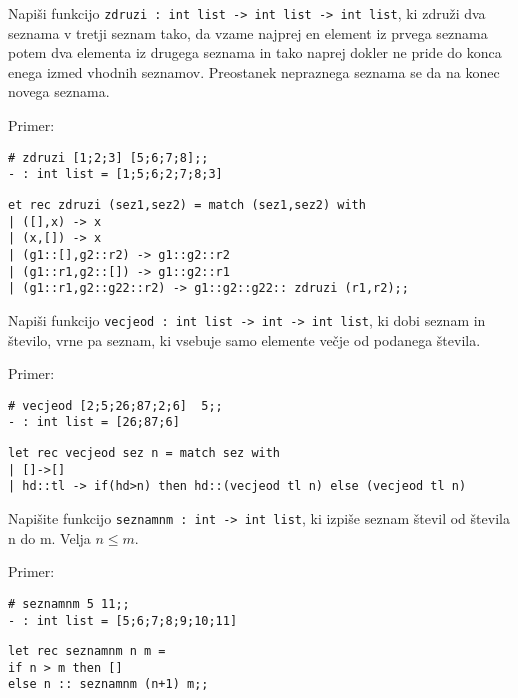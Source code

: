 \begin{ex} 
Napi\v si funkcijo \texttt{zdruzi : int list -> int list -> int list}, ki zdru\v zi dva seznama v tretji seznam tako, da vzame najprej en element iz prvega seznama potem dva elementa iz drugega seznama in tako naprej dokler ne pride do konca enega izmed vhodnih seznamov. Preostanek nepraznega seznama se da na konec novega seznama.

Primer: \begin{verbatim}
# zdruzi [1;2;3] [5;6;7;8];;
- : int list = [1;5;6;2;7;8;3]
\end{verbatim}

\begin{sol}
\begin{verbatim}
et rec zdruzi (sez1,sez2) = match (sez1,sez2) with
| ([],x) -> x 
| (x,[]) -> x 
| (g1::[],g2::r2) -> g1::g2::r2 
| (g1::r1,g2::[]) -> g1::g2::r1 
| (g1::r1,g2::g22::r2) -> g1::g2::g22:: zdruzi (r1,r2);;
\end{verbatim}
\end{sol}



\end{ex}
\begin{ex} 
Napi\v si funkcijo \texttt{vecjeod : int list -> int -> int list}, ki dobi seznam in \v stevilo, vrne pa seznam, ki vsebuje samo elemente ve\v cje od podanega \v stevila.

Primer: \begin{verbatim}
# vecjeod [2;5;26;87;2;6]  5;;
- : int list = [26;87;6] 
\end{verbatim}

\begin{sol}
\begin{verbatim}
let rec vecjeod sez n = match sez with
| []->[]
| hd::tl -> if(hd>n) then hd::(vecjeod tl n) else (vecjeod tl n)
\end{verbatim}
\end{sol}

\end{ex}
\begin{ex}
Napi\v site funkcijo \texttt{seznamnm : int -> int list}, ki izpi\v se seznam \v stevil od \v stevila n do m. Velja $n\le m$.

Primer: \begin{verbatim}
# seznamnm 5 11;;
- : int list = [5;6;7;8;9;10;11] 
\end{verbatim}

\begin{sol}
\begin{verbatim}
let rec seznamnm n m =
if n > m then []
else n :: seznamnm (n+1) m;;
\end{verbatim}
\end{sol}

\end{ex}
